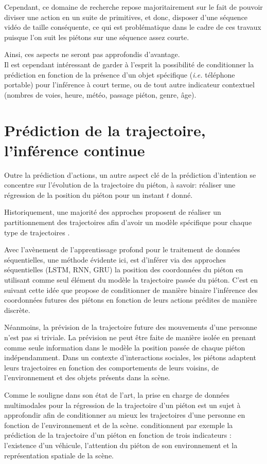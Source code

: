  Cependant, ce domaine de recherche repose majoritairement sur le fait de pouvoir diviser une action en un suite de primitives, et donc, disposer d'une séquence vidéo de taille conséquente, ce qui est problématique dans le cadre de ces travaux puisque l'on suit les piétons sur une séquence assez courte.
 
 Ainsi, ces aspects ne seront pas approfondis d'avantage.\\
 Il est cependant intéressant de garder à l'esprit la possibilité de conditionner la prédiction en fonction de la présence d'un objet spécifique (\textit{i.e.} téléphone portable) pour l'inférence à court terme, ou de tout autre indicateur contextuel (nombres de voies, heure, météo, passage piéton, genre, âge).

\section{Prédiction de la trajectoire, l'inférence continue}
Outre la prédiction d'actions, un autre aspect clé de la prédiction d'intention se concentre sur l'évolution de la trajectoire du piéton, à savoir: réaliser une régression de la position du piéton pour un instant $t$ donné.

Historiquement, une majorité des approches proposent de réaliser un partitionnement des trajectoires afin d'avoir un modèle spécifique pour chaque type de trajectoires \cite{zhou2011random, morris2011trajectory, kim2011gaussian}.

Avec l'avènement de l'apprentissage profond pour le traitement de données séquentielles, une méthode évidente ici, est d'inférer via des approches séquentielles (LSTM, RNN, GRU) la position des coordonnées du piéton en utilisant comme seul élément du modèle la trajectoire passée du piéton. C'est en suivant cette idée que \cite{DBLP:phd/hal/Pop19} propose de conditionner de manière binaire l'inférence des coordonnées futures des piétons en fonction de leurs actions prédites de manière discrète.

Néanmoins, la prévision de la trajectoire future des mouvements d'une personne n'est pas si triviale. La prévision ne peut être faite de manière isolée en prenant comme seule information dans le modèle la position passée de chaque piéton indépendamment. Dans un contexte d’interactions sociales, les piétons adaptent leurs trajectoires en fonction des comportements de leurs voisins, de l'environnement et des objets présents dans la scène.


Comme le souligne \cite{kong2018human} dans son état de l'art, la prise en charge de données multimodales pour la régression de la trajectoire d'un piéton est un sujet à approfondir afin de conditionner au mieux les trajectoires d'une personne en fonction de l'environnement et de la scène.
\cite{kooij2014context} conditionnent par exemple la prédiction de la trajectoire d'un piéton en fonction de trois indicateurs : l'existence d'un véhicule, l'attention du piéton de son environnement et la représentation spatiale de la scène.

